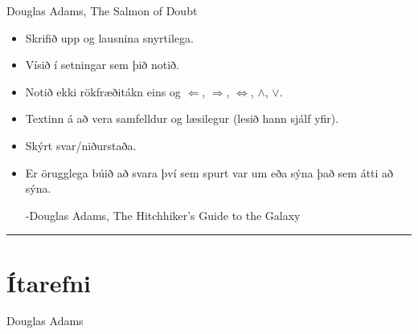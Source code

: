 \documentclass[b5paper,10pt,icelandic]{sphinxmanual}
\begin{document}
\textendash{} Douglas Adams, The Salmon of Doubt
\begin{itemize}
\item {} 
Skrifið upp  og lausnina snyrtilega.

\item {} 
Vísið í setningar sem þið notið.

\item {} 
Notið ekki rökfræðitákn eins og \(\Leftarrow\),
\(\Rightarrow\), \(\Leftrightarrow\), \(\wedge\),
\(\vee\).

\item {} 
Textinn á að vera samfelldur og læsilegur (lesið hann sjálf yfir).

\item {} 
Skýrt svar/niðurstaða.

\item {} 
Er örugglega búið að svara því sem spurt var um eða sýna það sem átti að sýna.



-Douglas Adams, The Hitchhiker’s Guide to the Galaxy

\end{itemize}


\bigskip\hrule\bigskip


\newpage


\section{Ítarefni}
\label{\detokenize{vidauki:itarefni}}

\textendash{} Douglas Adams
\end{document}
